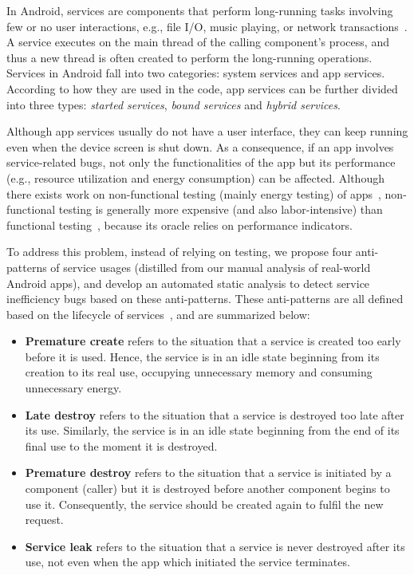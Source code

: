 \documentclass[sigconf,review, anonymous]{acmart}
\begin{document}
In Android, services are components
that perform long-running tasks involving few or no user interactions, e.g.,
file I/O, music playing, or network transactions~\cite{Androidservice}.
A service executes on the main thread of the calling component's process, and
thus a new thread is often created to perform the long-running operations.
Services in Android fall
into two categories: system services and app services.
According to how they are used in the code, app services can
be further divided into three types:
\textit{started services}, \textit{bound services} and \textit{hybrid services}.

Although app services usually do not have a user interface, they can keep running
even when the device screen is shut down. As a consequence, if an app involves
service-related bugs, not only the functionalities of the app but its
performance (e.g., resource utilization and energy consumption) can be affected.
Although there exists work on non-functional testing (mainly energy testing) of
apps~\cite{LiuXC14,BanerjeeC0R14,LiuXCL14,BehrouzSBM16,JabbarvandM17},
non-functional testing is generally more expensive (and also labor-intensive)
than functional testing~\cite{BehrouzSBM16}, because its oracle relies on
performance indicators.


 To address this problem, instead of relying on testing, we propose four
anti-patterns of service usages (distilled from our manual analysis
of real-world Android apps), and develop an automated static analysis to detect
service inefficiency bugs based on these anti-patterns. These
anti-patterns are all defined based on the lifecycle of
services~\cite{Androidservice}, and are summarized below:
\begin{itemize}
  \item {\bf Premature create} refers to the situation that a
service is created too early before it is used. Hence, the service is in
an idle state beginning from its creation to its real use, occupying unnecessary
memory and consuming unnecessary energy.
\item  {\bf Late destroy} refers to the situation
that a service is destroyed too late after its use. Similarly, the service is in
an idle state beginning from the end of its final use to the moment it is destroyed.
\item {\bf Premature destroy} refers to the situation that a service is initiated by a
component (caller) but it is destroyed before another component begins to use
it. Consequently, the service should be created again to fulfil the new request.
\item {\bf Service leak} refers to the situation that a service is never destroyed
after its use, not even when the app which initiated the service terminates.
\end{itemize}
\end{document}
